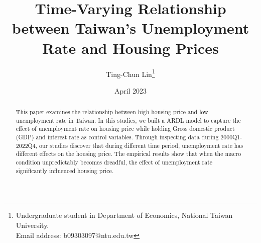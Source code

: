 \documentclass[12pt]{article}
\title{ Time-Varying Relationship between Taiwan's Unemployment Rate and Housing Prices }
\author{Ting-Chun Lin\thanks{
Undergraduate student in Department of Economics, National Taiwan University.\\ Email address: b09303097@ntu.edu.tw
}
}
\date{April 2023}
\begin{document}
\maketitle

\begin{abstract}
    This paper examines the relationship between high housing price and low unemployment rate in Taiwan. In this studies, we built a ARDL model to capture the effect of unemployment rate on housing price while holding Gross domestic product (GDP) and interest rate as control variables. Through inspecting data during 2000Q1-2022Q4, our studies discover that during different time period, unemployment rate has different effects on the housing price. The empirical results show that when the macro condition unpredictably becomes dreadful, the effect of unemployment rate significantly influenced housing price.
\end{abstract}
\end{document}
